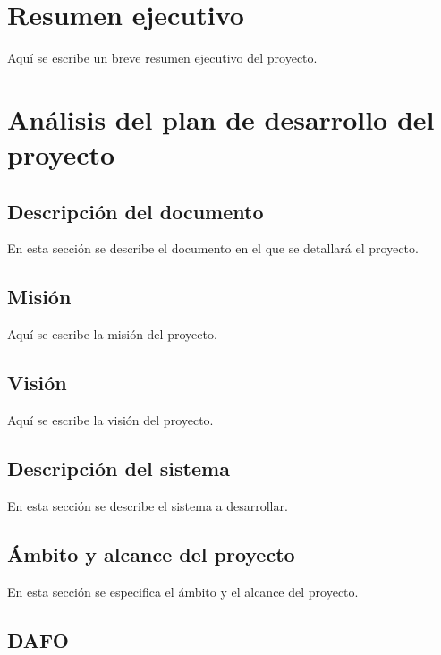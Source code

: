 \maketitle

\section{\textbf{Resumen ejecutivo}}

Aquí se escribe un breve resumen ejecutivo del proyecto.

\section{\textbf{Análisis del plan de desarrollo del proyecto}}

\subsection{\textbf{Descripción del documento}}

En esta sección se describe el documento en el que se detallará el proyecto.

\subsection{\textbf{Misión}}

Aquí se escribe la misión del proyecto.

\subsection{\textbf{Visión}}

Aquí se escribe la visión del proyecto.

\subsection{\textbf{Descripción del sistema}}

En esta sección se describe el sistema a desarrollar.

\subsection{\textbf{Ámbito y alcance del proyecto}}

En esta sección se especifica el ámbito y el alcance del proyecto.

\subsection{\textbf{DAFO}}

